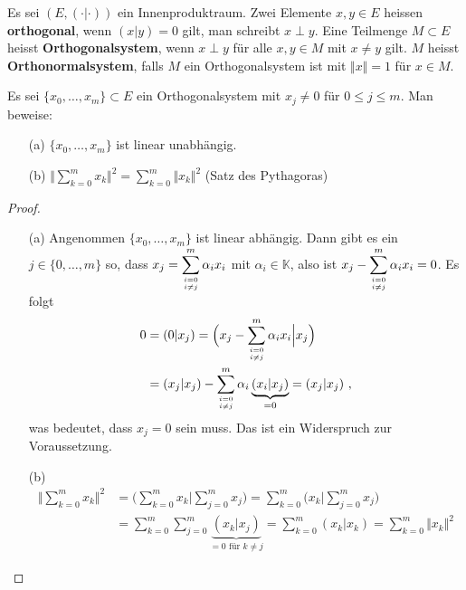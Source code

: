 \setcounter{aufgabe}{9}
\begin{aufgabe}
	Es sei $(E, (\cdot | \cdot))$ ein Innenproduktraum. Zwei Elemente $x, y \in E$ heissen
	\textbf{orthogonal}, wenn $(x | y) = 0$ gilt, man schreibt $x \perp y$. Eine Teilmenge
	$M \subset E$ heisst \textbf{Orthogonalsystem}, wenn $x \perp y$ für alle $x, y \in M$
	mit $x \neq y$ gilt. $M$ heisst \textbf{Orthonormalsystem}, falls $M$ ein 
	Orthogonalsystem ist mit $\Vert x \Vert = 1$ für $x \in M$.

	Es sei $\{x_0, \ldots, x_m\} \subset E$ ein Orthogonalsystem mit $x_j \neq 0$
	für $0 \leq j \leq m$. Man beweise:
	\begin{enumerate}
		\item[(a)] $\{x_0, \ldots, x_m\}$ ist linear unabhängig.
		\item[(b)] $\Big \Vert \displaystyle \sum_{k=0}^m x_k \Big \Vert^2 = \sum_{k=0}^m \Vert x_k \Vert^2$ 
			(Satz des Pythagoras)
	\end{enumerate}
\end{aufgabe}
\begin{proof}
	\begin{enumerate}
		\item[(a)] Angenommen $\{x_0, \ldots, x_m\}$ ist linear abhängig. Dann gibt es ein 
			$j \in \{0, \ldots, m\}$ so, dass $x_j = \displaystyle  \sum_{i=0 \atop i \neq j}^m \alpha_i x_i$ 
			mit $\alpha_i \in \mathbb K$, also ist 
			$x_j - \displaystyle \sum_{i=0 \atop i \neq j}^m \alpha_i x_i = 0$.
			Es folgt
			\begin{align*}
				0 &= (0 | x_j) = \Big ( x_j - \sum_{i=0 \atop i \neq j}^m \alpha_i x_i \Big \vert x_j \Big) \\
					&= ( x_j | x_j ) - \sum_{i=0 \atop i \neq j}^m \alpha_i \underbrace{ (x_i|x_j) }_{=0} 
					= (x_j | x_j) \ ,
			\end{align*}
			was bedeutet, dass $x_j = 0$ sein muss. Das ist ein Widerspruch zur Voraussetzung.
		\item[(b)] 
			\begin{align*}
				\Big \Vert \sum_{k=0}^m x_k \Big \Vert^2 
					&= \Big ( \sum_{k=0}^m x_k \Big \vert \sum_{j=0}^m x_j \Big )
					= \sum_{k=0}^m \Big( x_k \Big \vert \sum_{j=0}^m x_j \Big) \\
					&= \sum_{k=0}^m \sum_{j=0}^m \underbrace{ (x_k | x_j ) }_{=0 \text{ für } k \neq j} 
					= \sum_{k=0}^m (x_k | x_k) = \sum_{k=0}^m \Vert x_k \Vert^2
			\end{align*}
	\end{enumerate}
\end{proof}

